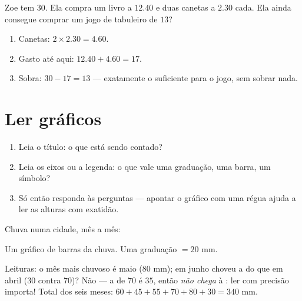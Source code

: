 \begin{example}\label{ex:g5:data:budget}
Zoe tem $30$. Ela compra um livro a $12.40$ e duas canetas a $2.30$
cada. Ela ainda consegue comprar um jogo de tabuleiro de $13$?
\begin{enumerate}
  \item Canetas: $2 \times 2.30 = 4.60$.
  \item Gasto até aqui: $12.40 + 4.60 = 17$.
  \item Sobra: $30 - 17 = 13$ --- exatamente o suficiente para o
        jogo, sem sobrar nada.
\end{enumerate}
\end{example}

\section{Ler gráficos}

\begin{method}\label{met:g5:data:read}
\begin{enumerate}
  \item Leia o título: o que está sendo contado?
  \item Leia os eixos ou a legenda: o que vale uma graduação, uma
        barra, um símbolo?
  \item Só então responda às perguntas --- apontar o gráfico com uma
        régua ajuda a ler as alturas com exatidão.
\end{enumerate}
\end{method}

\begin{example}\label{ex:g5:data:chart}
Chuva numa cidade, mês a mês:

\begin{omfigure}

{\small Um gráfico de barras da chuva. Uma graduação $= 20$ mm.}
\end{omfigure}

Leituras: o mês mais chuvoso é maio ($80$ mm); em junho choveu a
 do que em abril ($30$ contra $70$)? Não --- a  de $70$ é
$35$, então \emph{não chega} à : ler com precisão importa!
Total dos seis meses:
$60 + 45 + 55 + 70 + 80 + 30 = 340$ mm.
\end{example}

